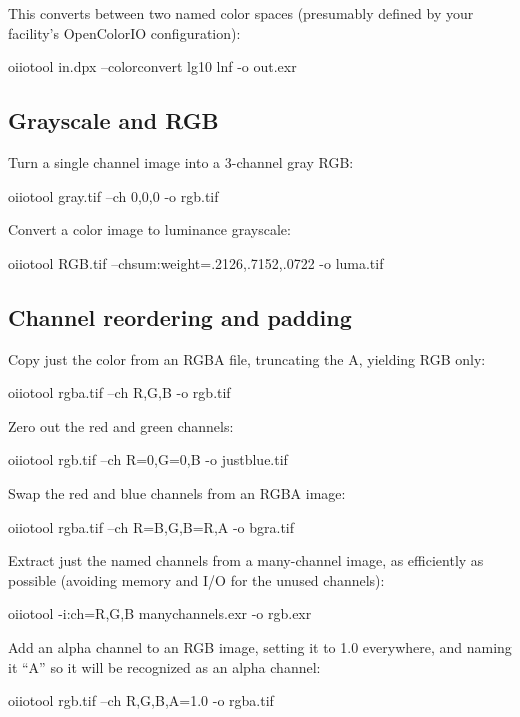 \noindent This converts between two named color spaces (presumably
defined by your facility's OpenColorIO configuration):

\begin{code}
    oiiotool in.dpx --colorconvert lg10 lnf -o out.exr
\end{code}


\subsection*{Grayscale and RGB}

\noindent Turn a single channel image into a 3-channel gray RGB:
\begin{code}
    oiiotool gray.tif --ch 0,0,0 -o rgb.tif
\end{code}

\noindent Convert a color image to luminance grayscale:

\begin{code}
    oiiotool RGB.tif --chsum:weight=.2126,.7152,.0722 -o luma.tif
\end{code}

\subsection*{Channel reordering and padding}

\noindent Copy just the color from an RGBA file, truncating the A,
yielding RGB only:
\begin{code}
    oiiotool rgba.tif --ch R,G,B -o rgb.tif
\end{code}

\noindent Zero out the red and green channels:
\begin{code}
    oiiotool rgb.tif --ch R=0,G=0,B -o justblue.tif
\end{code}

\noindent Swap the red and blue channels from an RGBA image:
\begin{code}
    oiiotool rgba.tif --ch R=B,G,B=R,A -o bgra.tif
\end{code}

\noindent Extract just the named channels from a many-channel image,
as efficiently as possible (avoiding memory and I/O for the unused
channels):
\begin{code}
    oiiotool -i:ch=R,G,B manychannels.exr -o rgb.exr
\end{code}

\noindent Add an alpha channel to an RGB image, setting it to 1.0 everywhere,
and naming it ``A'' so it will be recognized as an alpha channel:
\begin{code}
    oiiotool rgb.tif --ch R,G,B,A=1.0 -o rgba.tif
\end{code}

